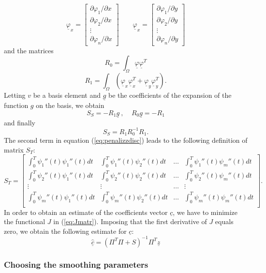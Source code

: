 \documentclass[a4paper,11pt,twoside,openright]{book}							%
\begin{document}
\begin{equation}
\underline \varphi_x=  \begin{bmatrix}
\partial \varphi_{1}/\partial x \\
\partial \varphi_{2}/\partial x  \\
\vdots\\
\partial \varphi_{n}/\partial x \end{bmatrix} 
\qquad
\underline \varphi_x=  \begin{bmatrix}
\partial \varphi_{1}/\partial y  \\
\partial \varphi_{2}/\partial y  \\
\vdots\\
\partial \varphi_{n}/\partial y\end{bmatrix} 
\end{equation}
and the matrices
$$ R_0 = \int_\Omega \underline \varphi \underline \varphi^T $$
$$ R_1 = \int_\Omega (\underline \varphi_x \underline \varphi_x^T + \underline \varphi_y \underline \varphi_y^T). $$
Letting $v$ be a basis element and $\underline g$ be the coefficients of the expansion of the function $g$ on the basis, we obtain
$$ S_S= - R_1 \underline g \ , \ \ \ \ \ R_0 \underline g = - R_1  $$
and finally
$$ S_S = R_1 R_0^{-1} R_1 .$$
The second term in equation (\ref{eq:penalizzdisc}) leads to the following definition of matrix $S_T$:
$$ S_T = \begin{bmatrix}
\int_0^T \psi_1''(t) \psi_1''(t) dt  & \int_0^T \psi_1''(t) \psi_2''(t) dt & \hdots & \int_0^T \psi_1''(t) \psi_m''(t) dt  \\
\int_0^T \psi_2''(t) \psi_1''(t) dt  & \int_0^T \psi_2''(t) \psi_2''(t) dt & \hdots & \int_0^T \psi_2''(t) \psi_m''(t) dt  \\
\vdots & \vdots & \hdots & \vdots \\
\int_0^T \psi_m''(t) \psi_1''(t) dt  & \int_0^T \psi_m''(t) \psi_2''(t) dt & \hdots & \int_0^T \psi_m''(t) \psi_m''(t) dt  \\
\end{bmatrix} .$$
In order to obtain an estimate of the coefficients vector $\underline c$, we have to minimize the functional $J$ in (\ref{eq:Jmatr}). Imposing that the first derivative of $J$ equals zero, we obtain the following estimate for $\underline c$:
$$ \hat  {\underline c} = (\Pi^T \Pi + S)^{-1}\Pi^T \underline z$$


\subsubsection*{Choosing the smoothing parameters}
\end{document}
